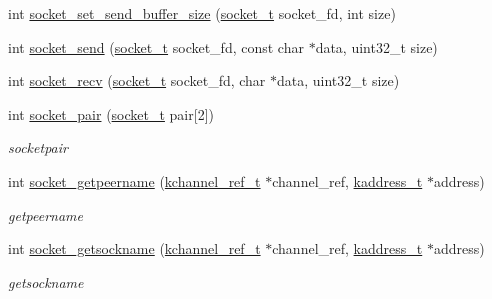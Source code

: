 \begin{DoxyCompactItemize}
\item 
int \hyperlink{a00100_a8489cd06398f759fff9660006dc8c10d_a8489cd06398f759fff9660006dc8c10d}{socket\+\_\+set\+\_\+send\+\_\+buffer\+\_\+size} (\hyperlink{a00066_a0d9e0afbf02fb6ed6c5b1415dce51b05_a0d9e0afbf02fb6ed6c5b1415dce51b05}{socket\+\_\+t} socket\+\_\+fd, int size)
\item 
int \hyperlink{a00100_a1acbefba637d7c0c3fd77355f84d4c22_a1acbefba637d7c0c3fd77355f84d4c22}{socket\+\_\+send} (\hyperlink{a00066_a0d9e0afbf02fb6ed6c5b1415dce51b05_a0d9e0afbf02fb6ed6c5b1415dce51b05}{socket\+\_\+t} socket\+\_\+fd, const char $\ast$data, uint32\+\_\+t size)
\item 
int \hyperlink{a00100_a8a4b901f1586de59d1d0a88d3326c934_a8a4b901f1586de59d1d0a88d3326c934}{socket\+\_\+recv} (\hyperlink{a00066_a0d9e0afbf02fb6ed6c5b1415dce51b05_a0d9e0afbf02fb6ed6c5b1415dce51b05}{socket\+\_\+t} socket\+\_\+fd, char $\ast$data, uint32\+\_\+t size)
\item 
int \hyperlink{a00100_a64d681185ca861b010c81db7479e9e08_a64d681185ca861b010c81db7479e9e08}{socket\+\_\+pair} (\hyperlink{a00066_a0d9e0afbf02fb6ed6c5b1415dce51b05_a0d9e0afbf02fb6ed6c5b1415dce51b05}{socket\+\_\+t} pair\mbox{[}2\mbox{]})
\begin{DoxyCompactList}\small\item\em socketpair \end{DoxyCompactList}\item 
int \hyperlink{a00100_a644c735078e8cc74601a1ea5cc52a430_a644c735078e8cc74601a1ea5cc52a430}{socket\+\_\+getpeername} (\hyperlink{a00066_a3b7e82599367eade261456f60ebe2cd9_a3b7e82599367eade261456f60ebe2cd9}{kchannel\+\_\+ref\+\_\+t} $\ast$channel\+\_\+ref, \hyperlink{a00066_a44e99fab0348ec54cfee119ddd9ceed6_a44e99fab0348ec54cfee119ddd9ceed6}{kaddress\+\_\+t} $\ast$address)
\begin{DoxyCompactList}\small\item\em getpeername \end{DoxyCompactList}\item 
int \hyperlink{a00100_ae9d654d20270a5ee5db0c90334c08c38_ae9d654d20270a5ee5db0c90334c08c38}{socket\+\_\+getsockname} (\hyperlink{a00066_a3b7e82599367eade261456f60ebe2cd9_a3b7e82599367eade261456f60ebe2cd9}{kchannel\+\_\+ref\+\_\+t} $\ast$channel\+\_\+ref, \hyperlink{a00066_a44e99fab0348ec54cfee119ddd9ceed6_a44e99fab0348ec54cfee119ddd9ceed6}{kaddress\+\_\+t} $\ast$address)
\begin{DoxyCompactList}\small\item\em getsockname \end{DoxyCompactList}\item 

\end{DoxyCompactItemize}
